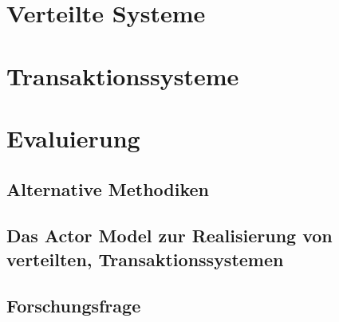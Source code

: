 
\chapter{Verteilte Systeme}
\chapter{Transaktionssysteme}
\chapter{Evaluierung}
\section{Alternative Methodiken}
\section{Das Actor Model zur Realisierung von verteilten, Transaktionssystemen} 
\section{Forschungsfrage}
